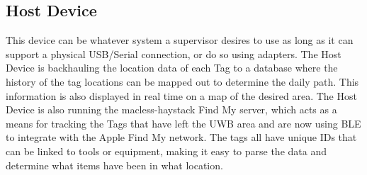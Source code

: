 \documentclass[conference]{IEEEtran}
\begin{document}
\subsection{Host Device}

This device can be whatever system a supervisor desires to use as long as it can support a physical USB/Serial connection, or do so using adapters. The Host Device is backhauling the location data of each Tag to a database where the history of the tag locations can be mapped out to determine the daily path. This information is also displayed in real time on a map of the desired area. The Host Device is also running the macless-haystack Find My server, which acts as a means for tracking the Tags that have left the UWB area and are now using BLE to integrate with the Apple Find My network. The tags all have unique IDs that can be linked to tools or equipment, making it easy to parse the data and determine what items have been in what location. 
\end{document}
